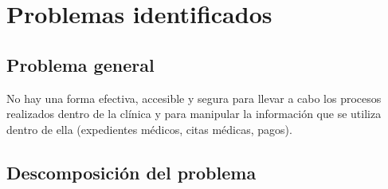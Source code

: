 \section{Problemas identificados}

\subsection{Problema general}

No hay una forma efectiva, accesible y segura para llevar a cabo los procesos realizados dentro de la cl\'inica y para manipular la informaci\'on que se utiliza dentro de ella (expedientes m\'edicos, citas m\'edicas, pagos). 

\subsection{Descomposición del problema}

